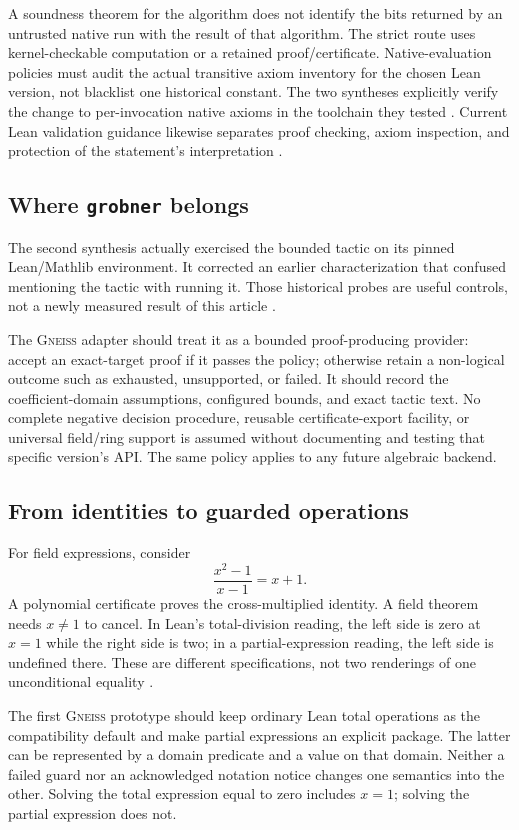 \documentclass[11pt,letterpaper]{article}
\newcommand{\code}[1]{\texttt{\detokenize{#1}}}
\newcommand{\Gneiss}{\textsc{Gneiss}}
\theoremstyle{definition}
\theoremstyle{remark}
\begin{document}
A soundness theorem for the algorithm does not identify the bits returned by an
untrusted native run with the result of that algorithm. The strict route uses
kernel-checkable computation or a retained proof/certificate. Native-evaluation
policies must audit the actual transitive axiom inventory for the chosen Lean
version, not blacklist one historical constant. The two syntheses explicitly
verify the change to per-invocation native axioms in the toolchain they tested
\cite{syn-a,syn-b}. Current Lean validation guidance likewise separates proof
checking, axiom inspection, and protection of the statement's interpretation
\cite{lean-validation}.

\subsection{Where \texttt{grobner} belongs}
The second synthesis actually exercised the bounded \code{grobner} tactic on
its pinned Lean/Mathlib environment. It corrected an earlier characterization
that confused mentioning the tactic with running it. Those historical probes
are useful controls, not a newly measured result of this article
\cite{syn-b}.

The \Gneiss{} adapter should treat it as a bounded proof-producing provider:
accept an exact-target proof if it passes the policy; otherwise retain a
non-logical outcome such as exhausted, unsupported, or failed. It should record
the coefficient-domain assumptions, configured bounds, and exact tactic text.
No complete negative decision procedure, reusable certificate-export facility,
or universal field/ring support is assumed without documenting and testing that
specific version's API. The same policy applies to any future algebraic backend.

\subsection{From identities to guarded operations}
For field expressions, consider
\[
                   \frac{x^2-1}{x-1}=x+1.
\]
A polynomial certificate proves the cross-multiplied identity. A field theorem
needs $x\ne1$ to cancel. In Lean's total-division reading, the left side is zero
at $x=1$ while the right side is two; in a partial-expression reading, the
left side is undefined there. These are different specifications, not two
renderings of one unconditional equality \cite{syn-a,syn-b}.

The first \Gneiss{} prototype should keep ordinary Lean total operations as the
compatibility default and make partial expressions an explicit package. The
latter can be represented by a domain predicate and a value on that domain.
Neither a failed guard nor an acknowledged notation notice changes one
semantics into the other. Solving the total expression equal to zero includes
$x=1$; solving the partial expression does not.
\end{document}
